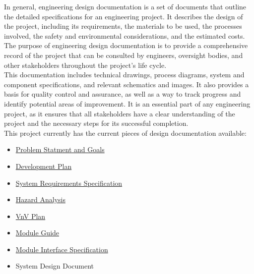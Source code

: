 \documentclass[12pt, titlepage]{article}
\begin{document}
In general, engineering design documentation is a set of documents that outline the detailed specifications for an engineering project. It describes the design of the project, including its requirements, the materials to be used, the processes involved, the safety and environmental considerations, and the estimated costs. The purpose of engineering design documentation is to provide a comprehensive record of the project that can be consulted by engineers, oversight bodies, and other stakeholders throughout the project’s life cycle.\\

This documentation includes technical drawings, process diagrams, system and component specifications, and relevant schematics and images. It also provides a basis for quality control and assurance, as well as a way to track progress and identify potential areas of improvement. It is an essential part of any engineering project, as it ensures that all stakeholders have a clear understanding of the project and the necessary steps for its successful completion.\\

This project currently has the current pieces of design documentation available:

\begin{itemize}
	\item \href{https://github.com/zakerl/Capstone_Project/blob/main/docs/ProblemStatementAndGoals/Team1_ProblemStatement\%20\%26\%20Goals.pdf}{Problem Statment and Goals}\\
	\item \href{https://github.com/zakerl/Capstone_Project/blob/main/docs/DevelopmentPlan/DevelopmentPlan.pdf}{Development Plan}\\
	\item \href{https://github.com/zakerl/Capstone_Project/blob/main/docs/SRS/SRS.pdf}{System Requirements Specification}\\
	\item \href{https://github.com/zakerl/Capstone_Project/blob/main/docs/HazardAnalysis/HazardAnalysis.pdf}{Hazard Analysis}\\
	\item \href{https://github.com/zakerl/Capstone_Project/blob/main/docs/VnVPlan/VnVPlan.pdf}{VnV Plan}\\
	\item \href{https://github.com/zakerl/Capstone_Project/blob/main/docs/Design/SoftArchitecture/MG.pdf}{Module Guide}\\
	\item \href{https://github.com/zakerl/Capstone_Project/blob/main/docs/Design/SoftDetailedDes/MIS.pdf}{Module Interface Specification}\\
	\item System Design Document\\
\end{itemize}
\end{document}
